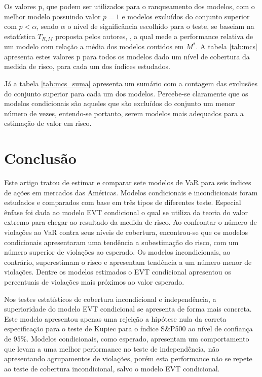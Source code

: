 \documentclass[1p]{elsarticle}
\theoremstyle{definition}
\begin{document}
Os valores p, que podem ser utilizados para o ranqueamento dos modelos, com o melhor modelo possuindo valor $p=1$ e modelos excluídos do conjunto superior com $p<\alpha$, sendo $\alpha$ o nível de significância escolhido para o teste, se baseiam na estatística $T_{R, M}$ proposta pelos autores, \cite{Hansen2011}, a qual mede a performance relativa de um modelo com relação a média dos modelos contidos em $M^\ast$. A tabela \ref{tab:mcs} apresenta estes valores p para todos os modelos dado um nível de cobertura da medida de risco, para cada um dos índices estudados.





Já a tabela \ref{tab:mcs_suma} apresenta um sumário com a contagem das exclusões do conjunto superior para cada um dos modelos. Percebe-se claramente que os modelos condicionais são aqueles que são excluídos do conjunto um menor número de vezes, entendo-se portanto, serem modelos mais adequados para a estimação de valor em risco.

\section{Conclusão}

Este artigo tratou de estimar e comparar sete modelos de VaR para seis índices de ações em mercados das Américas. Modelos condicionais e incondicionais foram estudados e comparados com base em três tipos de diferentes teste. Especial ênfase foi dada ao modelo EVT condicional o qual se utiliza da teoria do valor extremo para chegar ao resultado da medida de risco. Ao confrontar o número de violações ao VaR contra seus níveis de cobertura, encontrou-se que os modelos condicionais apresentaram uma tendência a subestimação do risco, com um número superior de violações ao esperado. Os modelos incondicionais, ao contrário, superestimam o risco e apresentam tendência a um número menor de violações. Dentre os modelos estimados o EVT condicional apresentou os percentuais de violações mais próximos ao valor esperado.

Nos testes estatísticos de cobertura incondicional e independência, a superioridade do modelo EVT condicional se apresenta de forma mais concreta. Este modelo apresentou apenas uma rejeição a hipótese nula da correta especificação para o teste de Kupiec para o índice S\&P500 ao nível de confiança de 95\%. Modelos condicionais, como esperado, apresentam um comportamento que levam a uma melhor performance no teste de independência, não apresentando agrupamentos de violações, porém esta performance não se repete ao teste de cobertura incondicional, salvo o modelo EVT condicional.
\end{document}
